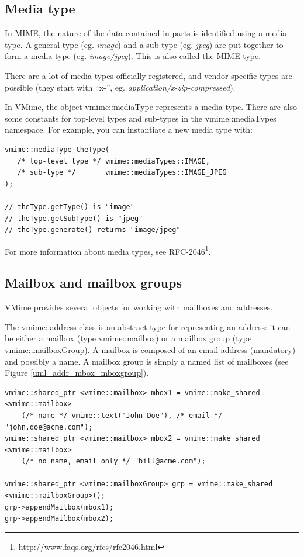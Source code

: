 \subsection{Media type} %

In MIME, the nature of the data contained in parts is identified using a
media type. A general type (eg. \emph{image}) and a sub-type (eg. \emph{jpeg})
are put together to form a media type (eg. \emph{image/jpeg}). This is also
called the MIME type.

There are a lot of media types officially registered, and vendor-specific
types are possible (they start with ``x-'', eg.
\emph{application/x-zip-compressed}).

In VMime, the object {\vcode vmime::mediaType} represents a media type. There
are also some constants for top-level types and sub-types in the
{\vcode vmime::mediaTypes} namespace. For example, you can instantiate a new
media type with:

\begin{lstlisting}
vmime::mediaType theType(
   /* top-level type */ vmime::mediaTypes::IMAGE,
   /* sub-type */       vmime::mediaTypes::IMAGE_JPEG
);

// theType.getType() is "image"
// theType.getSubType() is "jpeg"
// theType.generate() returns "image/jpeg"
\end{lstlisting}

For more information about media types, see
RFC-2046\footnote{http://www.faqs.org/rfcs/rfc2046.html}.

\subsection{Mailbox and mailbox groups} %

VMime provides several objects for working with mailboxes and addresses.

The {\vcode vmime::address} class is an abstract type for representing an
address: it can be either a mailbox (type {\vcode vmime::mailbox}) or a
mailbox group (type {\vcode vmime::mailboxGroup}). A mailbox is composed of
an email address (mandatory) and possibly a name. A mailbox group is simply
a named list of mailboxes (see Figure \ref{uml_addr_mbox_mboxgroup}).

\begin{lstlisting}[caption={Using mailboxes and mailbox groups}]
vmime::shared_ptr <vmime::mailbox> mbox1 = vmime::make_shared <vmime::mailbox>
    (/* name */ vmime::text("John Doe"), /* email */ "john.doe@acme.com");
vmime::shared_ptr <vmime::mailbox> mbox2 = vmime::make_shared <vmime::mailbox>
    (/* no name, email only */ "bill@acme.com");

vmime::shared_ptr <vmime::mailboxGroup> grp = vmime::make_shared <vmime::mailboxGroup>();
grp->appendMailbox(mbox1);
grp->appendMailbox(mbox2);
\end{lstlisting}


